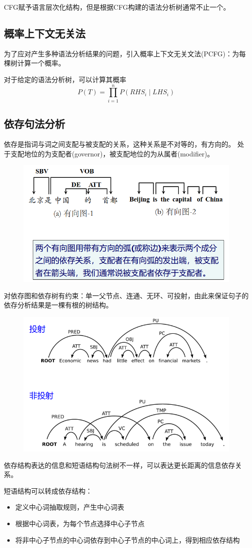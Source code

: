 CFG赋予语言层次化结构，但是根据CFG构建的语法分析树通常不止一个。

\subsection{概率上下文无关法}
为了应对产生多种语法分析结果的问题，引入概率上下文无关文法(PCFG)：为每棵树计算一个概率。

对于给定的语法分析树，可以计算其概率
\[P(T)=\prod_{i=1}^nP(RHS_i\mid LHS_i)\]


\subsection{依存句法分析}
\begin{definition}[依存]
依存是指词与词之间支配与被支配的关系，这种关系是不对等的，有方向的。
处于支配地位的为支配者(governor)，被支配地位的为从属者(modifier)。
\end{definition}
\begin{figure}[H]
\centering
\includegraphics[width=0.6\linewidth]{fig/dependency_parser.png}
\end{figure}

对依存图和依存树有约束：单一父节点、连通、无环、可投射，由此来保证句子的依存分析结果是一棵有根的树结构。
\begin{figure}[H]
\centering
\includegraphics[width=0.6\linewidth]{fig/projective.png}
\end{figure}
依存结构表达的信息和短语结构句法树不一样，可以表达更长距离的信息依存关系。

短语结构可以转成依存结构：
\begin{itemize}
	\item 定义中心词抽取规则，产生中心词表
	\item 根据中心词表，为每个节点选择中心子节点
	\item 将非中心子节点的中心词依存到中心子节点的中心词上，得到相应依存结构
\end{itemize}